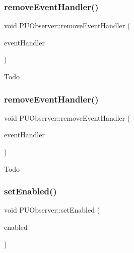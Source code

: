\subsubsection{\texorpdfstring{remove\+Event\+Handler()}{removeEventHandler()}\hspace{0.1cm}{\footnotesize\ttfamily [1/2]}}
{\footnotesize\ttfamily void P\+U\+Observer\+::remove\+Event\+Handler (\begin{DoxyParamCaption}\item[{\hyperlink{classPUEventHandler}{P\+U\+Event\+Handler} $\ast$}]{event\+Handler }\end{DoxyParamCaption})}

Todo \mbox{\label{classPUObserver_abd9e5585ab25795109269ba07fbc51e6}} 
\subsubsection{\texorpdfstring{remove\+Event\+Handler()}{removeEventHandler()}\hspace{0.1cm}{\footnotesize\ttfamily [2/2]}}
{\footnotesize\ttfamily void P\+U\+Observer\+::remove\+Event\+Handler (\begin{DoxyParamCaption}\item[{\hyperlink{classPUEventHandler}{P\+U\+Event\+Handler} $\ast$}]{event\+Handler }\end{DoxyParamCaption})}

Todo \mbox{\label{classPUObserver_a5f2b1a071d5579cac1cfbc09b9871853}} 
\subsubsection{\texorpdfstring{set\+Enabled()}{setEnabled()}\hspace{0.1cm}{\footnotesize\ttfamily [1/2]}}
{\footnotesize\ttfamily void P\+U\+Observer\+::set\+Enabled (\begin{DoxyParamCaption}\item[{bool}]{enabled }\end{DoxyParamCaption})\hspace{0.3cm}{\ttfamily [virtual]}}

